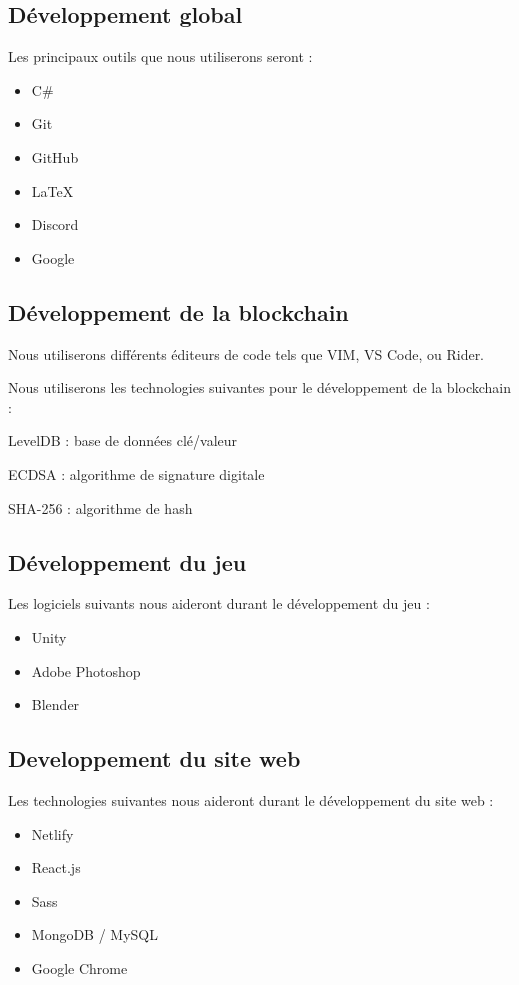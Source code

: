 \documentclass{article}
\begin{document}
\subsection{Développement global}
Les principaux outils que nous utiliserons seront :
\begin{itemize}
    \item C\#
    \item Git
    \item GitHub
    \item \LaTeX
    \item Discord
    \item Google

\end{itemize}

\subsection{Développement de la blockchain}
Nous utiliserons différents éditeurs de code tels que VIM, VS Code, ou Rider.

Nous utiliserons les technologies suivantes pour le développement de la blockchain :
\begin{itemize}
\begin{samepage}
    \item LevelDB : base de données clé/valeur
    \item ECDSA : algorithme de signature digitale
    \item SHA-256 : algorithme de hash
\end{samepage}
\end{itemize}

\subsection{Développement du jeu}

Les logiciels suivants nous aideront durant le développement du jeu :
\begin{itemize}
    \item Unity
    \item Adobe Photoshop
    \item Blender
\end{itemize}

\subsection{Developpement du site web}
Les technologies suivantes nous aideront durant le développement du site web :
\begin{itemize}
    \item Netlify
    \item React.js
    \item Sass
    \item MongoDB / MySQL
    \item Google Chrome
\end{itemize}
\end{document}
